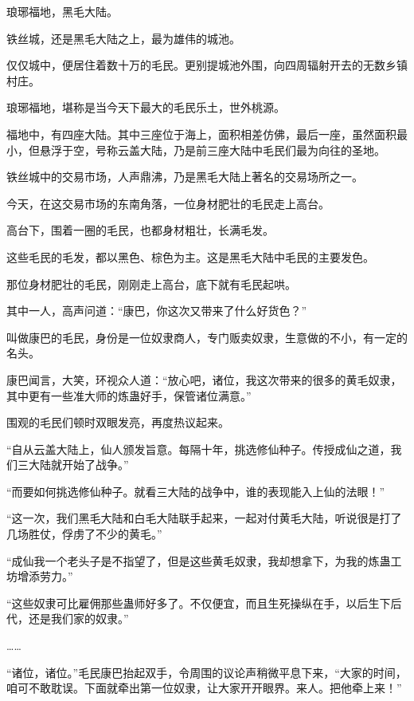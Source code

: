 
\begin{this_body}

琅琊福地，黑毛大陆。

铁丝城，还是黑毛大陆之上，最为雄伟的城池。

仅仅城中，便居住着数十万的毛民。更别提城池外围，向四周辐射开去的无数乡镇村庄。

琅琊福地，堪称是当今天下最大的毛民乐土，世外桃源。

福地中，有四座大陆。其中三座位于海上，面积相差仿佛，最后一座，虽然面积最小，但悬浮于空，号称云盖大陆，乃是前三座大陆中毛民们最为向往的圣地。

铁丝城中的交易市场，人声鼎沸，乃是黑毛大陆上著名的交易场所之一。

今天，在这交易市场的东南角落，一位身材肥壮的毛民走上高台。

高台下，围着一圈的毛民，也都身材粗壮，长满毛发。

这些毛民的毛发，都以黑色、棕色为主。这是黑毛大陆中毛民的主要发色。

那位身材肥壮的毛民，刚刚走上高台，底下就有毛民起哄。

其中一人，高声问道：“康巴，你这次又带来了什么好货色？”

叫做康巴的毛民，身份是一位奴隶商人，专门贩卖奴隶，生意做的不小，有一定的名头。

康巴闻言，大笑，环视众人道：“放心吧，诸位，我这次带来的很多的黄毛奴隶，其中更有一些准大师的炼蛊好手，保管诸位满意。”

围观的毛民们顿时双眼发亮，再度热议起来。

“自从云盖大陆上，仙人颁发旨意。每隔十年，挑选修仙种子。传授成仙之道，我们三大陆就开始了战争。”

“而要如何挑选修仙种子。就看三大陆的战争中，谁的表现能入上仙的法眼！”

“这一次，我们黑毛大陆和白毛大陆联手起来，一起对付黄毛大陆，听说很是打了几场胜仗，俘虏了不少的黄毛。”

“成仙我一个老头子是不指望了，但是这些黄毛奴隶，我却想拿下，为我的炼蛊工坊增添劳力。”

“这些奴隶可比雇佣那些蛊师好多了。不仅便宜，而且生死操纵在手，以后生下后代，还是我们家的奴隶。”

……

“诸位，诸位。”毛民康巴抬起双手，令周围的议论声稍微平息下来，“大家的时间，咱可不敢耽误。下面就牵出第一位奴隶，让大家开开眼界。来人。把他牵上来！”


\end{this_body}
